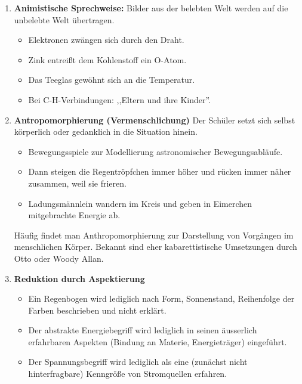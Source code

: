 \begin{enumerate}
	\item \textbf{Animistische Sprechweise:} Bilder aus der belebten
	Welt werden auf die unbelebte Welt \"{u}bertragen.
	
	\mip
	\begin{beisp}
	\begin{itemize}
		\item Elektronen zw\"{a}ngen sich durch den Draht.
		\item Zink entrei{\ss}t dem Kohlenstoff ein O-Atom.
		\item Das Tee\-glas gew\"{o}hnt sich an die Temperatur.
		\item Bei C-H-Verbindungen: ,,Eltern und ihre Kinder''.
	\end{itemize}
	\end{beisp}
	
	\item \textbf{Antropomorphierung (Vermenschlichung)}
	Der Sch\"{u}ler setzt sich selbst k\"{o}rperlich oder gedanklich in die
	Situation hinein.
	
	\begin{beisp}
	\begin{itemize}
		\item Bewegungsspiele zur Modellierung
		astronomischer Bewegungsabl\"{a}ufe.
		\item Dann steigen die Regentr\"{o}pfchen immer h\"{o}her und r\"{u}cken immer
		n\"{a}her zusammen, weil sie frieren.
		\item Ladungsm\"{a}nnlein wandern im Kreis und geben in Eimerchen
		mitgebrachte Energie ab.
	\end{itemize}
	\end{beisp}
	
	H\"{a}ufig findet man Anthropomorphierung zur Darstellung von
	Vorg\"{a}ngen im menschlichen K\"{o}rper.
	Bekannt sind eher kabarettistische Umsetzungen durch Otto
	oder Woody Allan.
	
	\item \textbf{Reduktion durch Aspektierung}
	
	\begin{beisp}
	\begin{itemize}
		\item  Ein Regenbogen wird lediglich nach Form,
		Sonnenstand, Reihenfolge der Farben beschrieben und nicht
		erkl\"{a}rt.
		\item Der abstrakte Energiebegriff wird lediglich in
		seinen \"{a}usserlich erfahrbaren Aspekten (Bindung an Materie, Energietr\"{a}ger)
		eingef\"{u}hrt.
		\item Der Spannungsbegriff wird lediglich als eine
		(zun\"{a}chst nicht hinterfragbare) Kenngr\"{o}{\ss}e von
		Stromquellen erfahren.
	\end{itemize}
	\end{beisp}
	

\end{enumerate}
